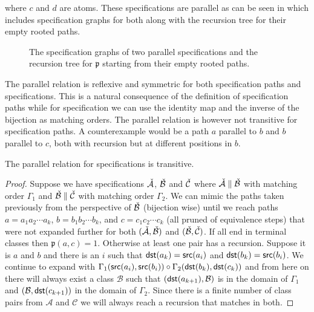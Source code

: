 where $c$ and $d$ are atoms. These specifications are parallel as can be seen in  which includes specification graphs for both along with the recursion tree for their empty rooted paths.
\begin{figure}[ht!]
    \centering
    
    \vspace{0.7cm}
    
    \caption{The specification graphs of two parallel specifications and the recursion tree for $\mathfrak{p}$ starting from their empty rooted paths.}
    \label{fig:para_spec}
\end{figure}

The parallel relation is reflexive and symmetric for both specification paths and specifications. This is a natural consequence of the definition of specification paths while for specification we can use the identity map and the inverse of the bijection as matching orders. The parallel relation is however not transitive for specification paths. A counterexample would be a path $a$ parallel to $b$ and $b$ parallel to $c$, both with recursion but at different positions in $b$.

\begin{proposition}
The parallel relation for specifications is transitive.
\end{proposition}
\begin{proof}
Suppose we have specifications $\check{\mathcal{A}}$, $\check{\mathcal{B}}$ and $\check{\mathcal{C}}$ where $\check{\mathcal{A}} \parallel \check{\mathcal{B}}$ with matching order $\Gamma_1$ and $\check{\mathcal{B}} \parallel \check{\mathcal{C}}$ with matching order $\Gamma_2$. We can mimic the paths taken previously from the perspective of $\check{\mathcal{B}}$ (bijection wise) until we reach paths $a = a_1a_2 \dotsm a_k$, $b = b_1b_2 \dotsm b_k$, and $c = c_1c_2 \dotsm c_k$ (all pruned of equivalence steps) that were not expanded further for both $(\check{\mathcal{A}},\check{\mathcal{B}})$ and $(\check{\mathcal{B}},\check{\mathcal{C}})$. If all end in terminal classes then $\mathfrak{p}(a,c)=1$. Otherwise at least one pair has a recursion. Suppose it is $a$ and $b$ and there is an $i$ such that $\textsf{dst}(a_k)=\textsf{src}(a_i)$ and $\textsf{dst}(b_k)=\textsf{src}(b_i)$. We continue to expand with $\Gamma_1(\textsf{src}(a_i),\textsf{src}(b_i)) \circ \Gamma_2(\textsf{dst}(b_k),\textsf{dst}(c_k))$ and from here on there will always exist a class $\mathcal{B}$ such that $(\textsf{dst}(a_{k+1}),\mathcal{B})$ is in the domain of $\Gamma_1$ and $(\mathcal{B}, \textsf{dst}(c_{k+1}))$ in the domain of $\Gamma_2$. Since there is a finite number of class pairs from $\mathcal{A}$ and $\mathcal{C}$ we will always reach a recursion that matches in both.
\end{proof}


